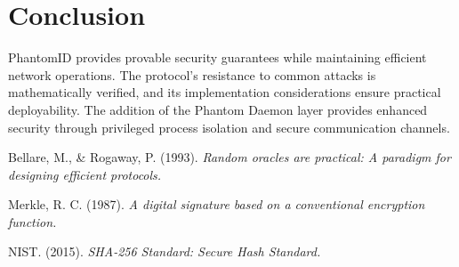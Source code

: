 \documentclass[12pt]{article}
\theoremstyle{definition}
\theoremstyle{remark}
\begin{document}
\section{Conclusion}
PhantomID provides provable security guarantees while maintaining efficient network operations. The protocol's resistance to common attacks is mathematically verified, and its implementation considerations ensure practical deployability. The addition of the Phantom Daemon layer provides enhanced security through privileged process isolation and secure communication channels.

\begin{thebibliography}{9}
Bellare, M., \& Rogaway, P. (1993).
\textit{Random oracles are practical: A paradigm for designing efficient protocols.}

Merkle, R. C. (1987).
\textit{A digital signature based on a conventional encryption function.}

NIST. (2015).
\textit{SHA-256 Standard: Secure Hash Standard.}
\end{thebibliography}
\end{document}
